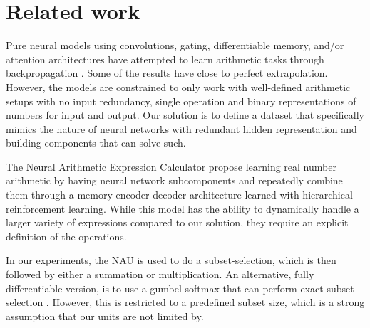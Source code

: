 \section{Related work}
Pure neural models using convolutions, gating, differentiable memory, and/or attention architectures have attempted to learn arithmetic tasks through backpropagation \cite{NeuralGPU,GridLSTM,NTM,FreivaldsL17}.
Some of the results have close to perfect extrapolation. However, the models are constrained to only work with well-defined arithmetic setups with no input redundancy, single operation and binary representations of numbers for input and output.
Our solution is to define a dataset that specifically mimics the nature of neural networks with redundant hidden representation and building components that can solve such.

The Neural Arithmetic Expression Calculator \cite{NAEC} propose learning real number arithmetic by having neural network subcomponents and repeatedly combine them through a memory-encoder-decoder architecture learned with hierarchical reinforcement learning.
While this model has the ability to dynamically handle a larger variety of expressions compared to our solution, they require an explicit definition of the operations.

In our experiments, the NAU is used to do a subset-selection, which is then followed by either a summation or multiplication.
An alternative, fully differentiable version, is to use a gumbel-softmax that can perform exact subset-selection \cite{DSS}.
However, this is restricted to a predefined subset size, which is a strong assumption that our units are not limited by.
